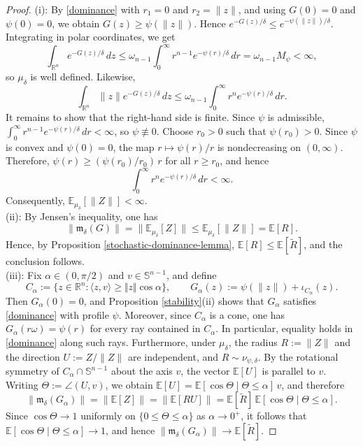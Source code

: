 \documentclass[11pt]{article}
\newcommand{\1}{\mathds{1}}
\theoremstyle{definition}
\theoremstyle{remark}
\theoremstyle{definition}
\begin{document}
\begin{proof}
(i): By \eqref{dominance} with \(r_1=0\) and \(r_2=\|z\|\), and using
\(G(0)=0\) and \(\psi(0)=0\), we obtain \(G(z)\ge \psi(\|z\|)\). Hence
\(e^{-G(z)/\delta}\le e^{-\psi(\|z\|)/\delta}\). Integrating in polar
coordinates, we get
\[
\int_{\mathbb R^n} e^{-G(z)/\delta}\,dz
\le
\omega_{n-1}\int_0^\infty r^{n-1}e^{-\psi(r)/\delta}\,dr
=
\omega_{n-1}M_\psi
<\infty,
\]
so \(\mu_\delta\) is well defined. Likewise,
\[
\int_{\mathbb R^n}\|z\|e^{-G(z)/\delta}\,dz
\le
\omega_{n-1}\int_0^\infty r^n e^{-\psi(r)/\delta}\,dr.
\]
It remains to show that the right-hand side is finite. Since \(\psi\) is
admissible, \(\int_0^\infty r^{n-1}e^{-\psi(r)/\delta}\,dr<\infty\), so
\(\psi\not\equiv 0\). Choose \(r_0>0\) such that \(\psi(r_0)>0\). Since
\(\psi\) is convex and \(\psi(0)=0\), the map \(r\mapsto \psi(r)/r\) is
nondecreasing on \((0,\infty)\). Therefore,
\(\psi(r)\ge (\psi(r_0)/r_0)\,r\) for all \(r\ge r_0\), and hence
\[
\int_0^\infty r^n e^{-\psi(r)/\delta}\,dr<\infty.
\]
Consequently, \(\mathbb E_{\mu_\delta}[\|Z\|]<\infty\).\\
(ii): By Jensen's inequality, one has
\[
\|\mathfrak{m}_\delta(G)\| = \|\mathbb E_{\mu_\delta}[Z]\| \le \mathbb E_{\mu_\delta}[\|Z\|] = \mathbb E[R].
\]
Hence, by Proposition \ref{stochastic-dominance-lemma},
\(\mathbb E[R]\le \mathbb{E}[\widetilde R]\), and the conclusion follows.\\
(iii): Fix \(\alpha\in(0,\pi/2)\) and \(v\in\mathbb S^{n-1}\), and define
\[
C_\alpha:=\{z\in\mathbb R^n:\langle z,v\rangle\ge \Vert z\Vert \cos\alpha\},
\qquad
G_\alpha(z):=\psi(\|z\|)+\iota_{C_\alpha}(z).
\]
Then \(G_\alpha(0)=0\), and  Proposition \ref{stability}(ii) shows that \(G_\alpha\) satisfies \eqref{dominance} with profile \(\psi\). Moreover, since \(C_\alpha\) is a cone, one has \(G_\alpha(r\omega)=\psi(r)\) for every ray contained in \(C_\alpha\). In particular, equality holds in \eqref{dominance} along such rays. Furthermore, under \(\mu_\delta\), the radius \(R:=\|Z\|\) and the direction
\(U:=Z/\|Z\|\) are independent, and \(R\sim \nu_{\psi,\delta}\). By the
rotational symmetry of \(C_\alpha\cap \mathbb S^{n-1}\) about the axis \(v\),
the vector \(\mathbb E[U]\) is parallel to \(v\). Writing
\(\Theta:=\angle(U,v)\), we obtain $\mathbb E[U]=\mathbb E[\cos\Theta\mid \Theta\le \alpha]\,v$, and therefore
\[
\|\mathfrak m_\delta(G_\alpha)\|
=
\|\mathbb E[Z]\|
=
\|\mathbb E[RU]\|
=
\mathbb{E}[\widetilde R]\,
\mathbb E[\cos\Theta\mid \Theta\le \alpha].
\]
Since \(\cos\Theta\to 1\) uniformly on \(\{0\le \Theta\le \alpha\}\) as
\(\alpha\to 0^+\), it follows that $\mathbb E[\cos\Theta\mid \Theta\le \alpha]\to 1$, 
and hence $\|\mathfrak m_\delta(G_\alpha)\|\to \mathbb{E}[\widetilde R]$.
\end{proof}
\end{document}
